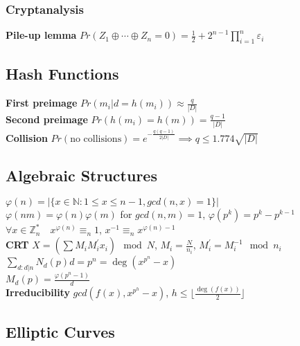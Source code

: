 \documentclass[twoside, 11pt]{article}
\begin{document}
            \subsubsection*{Cryptanalysis}
                \textbf{Pile-up lemma} $Pr(Z_{1} \oplus \cdots \oplus Z_{n} = 0) = \frac{1}{2} + 2^{n-1}\prod_{i=1}^{n}\varepsilon_{i}$ \\


        \subsection*{Hash Functions}
            \textbf{First preimage} $Pr(m_{i} | d=h(m_{i})) \approx \frac{q}{|D|}$ \\
            \textbf{Second preimage} $Pr(h(m_{i}) = h(m)) = \frac{q-1}{|D|}$ \\
            \textbf{Collision} $Pr(\text{no collisions}) = e^{-\frac{q(q-1)}{2|D|}} \implies q \leqslant 1.774\sqrt{|D|}$

        \subsection*{Algebraic Structures}
            $\varphi(n) = |\lbrace x \in \mathds{N} : 1 \leqslant x \leqslant n-1, gcd(n, x) = 1 \rbrace|$ \\
            $\varphi(nm) = \varphi(n)\varphi(m)$ for $gcd(n, m) =1$, $\varphi(p^{k}) = p^{k} - p^{k-1}$ \\
            $\forall x \in \mathds{Z}_{n}^{*} \quad x^{\varphi(n)} \equiv_{n} 1$, $x^{-1} \equiv_{n} x^{\varphi(n) -1}$ \\
            \textbf{CRT} $X = (\sum M_{i}M^{'}_{i}x_{i}) \mod{N}$, $M_{i} = \frac{N}{n_{i}}$, $M_{i}^{'} = M_{i}^{-1}\mod{n_{i}}$ \\ 
            $\sum_{d: d|n}N_{d}(p)d = p^{n} = \deg(x^{p^{n}}-x)$ \\
            $M_{d}(p) = \frac{\varphi(p^{n}-1)}{d}$ \\
            \textbf{Irreducibility} $gcd(f(x), x^{p^{h}}-x)$, $h \leqslant \lfloor \frac{\deg(f(x))}{2} \rfloor$ \\

        \subsection*{Elliptic Curves}
\end{document}
